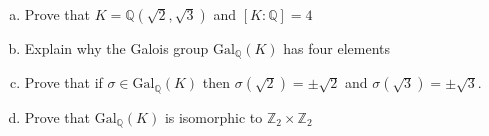 \documentclass[11pt]{exam}
\theoremstyle{definition}
\begin{document}
\begin{questions}
\begin{enumerate}[(a)]
\item Prove that $K = \mathbb Q(\sqrt{2}, \sqrt{3})$ and $[K:\mathbb Q] = 4$
\vspace{3in}
\item Explain why the Galois group $\text{Gal}_{\mathbb Q}(K)$ has four elements
\vspace{1in}
\item Prove that if $\sigma\in \text{Gal}_{\mathbb Q}(K)$ then $\sigma(\sqrt{2}) = \pm \sqrt{2}$ and $\sigma(\sqrt{3}) = \pm \sqrt{3}$.
\vspace{2in}
\item Prove that $\text{Gal}_{\mathbb Q}(K)$ is isomorphic to $\mathbb Z_2\times\mathbb Z_2$
\end{enumerate}







\end{questions}
\end{document}
